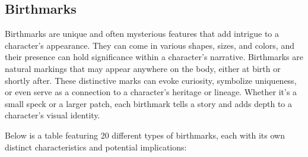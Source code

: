 \subsection{\textbf{Birthmarks}}

Birthmarks are unique and often mysterious features that add intrigue to a character's appearance. They can come in various shapes, sizes, and colors, and their presence can hold significance within a character's narrative. Birthmarks are natural markings that may appear anywhere on the body, either at birth or shortly after. These distinctive marks can evoke curiosity, symbolize uniqueness, or even serve as a connection to a character's heritage or lineage. Whether it's a small speck or a larger patch, each birthmark tells a story and adds depth to a character's visual identity.

Below is a table featuring 20 different types of birthmarks, each with its own distinct characteristics and potential implications:

